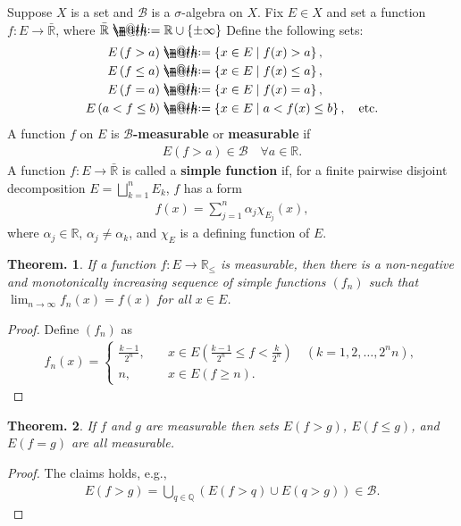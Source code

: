 \documentclass[openany, a4paper, oneside]{jsbook}
\makeatletter
\newcommand*{\defeq}{\mathrel{\rlap{%
\raisebox{0.3ex}{$\m@th\cdot$}}%
\raisebox{-0.3ex}{$\m@th\cdot$}}%
=}
\theoremstyle{break}
\theoremstyle{breakdefn}
\newtheorem{thm}{Theorem.}[section]
\newcommand{\rbk}[1]{\left (#1\right)}
\newcommand{\cbk}[1]{\left\{#1\right\}}
\newcommand{\relmiddle}[1]{\mathrel{}\middle#1\mathrel{}}
\newcommand{\set}[2]{\left\{#1 \relmiddle| #2\right\}}
\newcommand{\bbQ}{\mathbb{Q}}
\newcommand{\bbR}{\mathbb{R}}
\newcommand{\bbRbar}{\bar{\mathbb{R}}}
\newcommand{\calB}{\mathcal{B}}
\makeatother
\begin{document}
Suppose $X$ is a set and $\calB$ is a $\sigma$-algebra on $X$.
Fix $E \in X$ and set a function $f \colon E \to \bbRbar$, where $\bbRbar \defeq \bbR \cup \cbk{\pm \infty}$
Define the following sets:
\begin{align}
 E \rbk{f > a}
 &\defeq
 \set{x \in E}{f (x) > a}, \\
 E \rbk{f \leq a}
 &\defeq
 \set{x \in E}{f (x) \leq a}, \\
 E \rbk{f = a}
 &\defeq
 \set{x \in E}{f (x) = a}, \\
 E \rbk{a < f \leq b}
 &\defeq
 \set{x \in E}{a < f (x) \leq b}, \quad \text{etc.}\\
\end{align}
A function $f$ on $E$ is \textbf{$\calB$-measurable} or \textbf{measurable} if
\begin{align}
 E \rbk{f > a} \in \calB \quad \forall a \in \bbR.
\end{align}
A function $f \colon E \to \bbRbar$ is called a \textbf{simple function} if,
for a finite pairwise disjoint decomposition $E = \bigsqcup_{k=1}^n E_k$, $f$ has a form
\begin{align}
 f (x)
 =
 \sum_{j=1}^n \alpha_j \chi_{E_j}(x),
\end{align}
where $\alpha_j \in \bbR$, $\alpha_j \neq \alpha_k$, and $\chi_{E}$ is a defining function of $E$.
\begin{thm}
 If a function $f \colon E \to \bbR_{\leq}$ is measurable,
 then there is a non-negative and  monotonically increasing sequence of simple functions $(f_n)$
 such that $\lim_{n \to \infty} f_n (x) = f (x)$ for all $x \in E$.
\end{thm}
\begin{proof}
Define $(f_n)$ as
\begin{align}
 f_n (x)
 =
 \begin{cases}
  \frac{k-1}{2^n}, \quad &x \in E\rbk{\frac{k-1}{2^n} \leq f < \frac{k}{2^n}} \quad (k = 1, 2, \dots, 2^n n), \\
  n, \quad &x \in E (f \geq n).
 \end{cases}
\end{align}
\end{proof}
\begin{thm}
 If $f$ and $g$ are measurable then sets $E (f > g)$, $E (f \leq g)$, and $E (f = g)$ are all measurable.
\end{thm}
\begin{proof}
The claims holds, e.g.,
\begin{align}
 E (f > g)
 =
 \bigcup_{q \in \bbQ} \rbk{E (f > q) \cup E (q > g)}
 \in
 \calB.
\end{align}
\end{proof}
\end{document}
